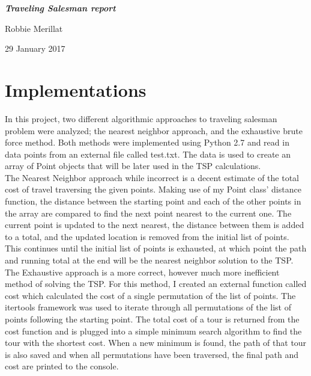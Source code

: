 \documentclass[11pt]{article}
\newcommand\tab[1][.5in]{\hspace*{#1}}
\begin{document}
\begin{titlepage}
\vspace*{\fill}
{
    \centering
    \bfseries
    \emph{\Huge Traveling Salesman report}
    \vskip 1.5in

    \Large Robbie Merillat \\
    \vskip 2in

    29 January 2017

}
\vspace*{\fill}
\clearpage
\end{titlepage}

\section{Implementations}
\tab In this project, two different algorithmic approaches to traveling salesman problem were analyzed; the nearest neighbor approach, and the exhaustive brute force method. Both methods were implemented using Python 2.7 and read in data points from an external file called test.txt. The data is used to create an array of Point objects that will be later used in the TSP calculations.\\
\tab The Nearest Neighbor approach while incorrect is a decent estimate of the total cost of travel traversing the given points. Making use of my Point class' distance function, the distance between the starting point and each of the other points in the array are compared to find the next point nearest to the current one. The current point is updated to the next nearest, the distance between them is added to a total, and the updated location is removed from the initial list of points. This continues until the initial list of points is exhausted, at which point the  path and running total at the end will be the nearest neighbor solution to the TSP.\\
\tab The Exhaustive approach is a more correct, however much more inefficient method of solving the TSP. For this method, I created an external function called cost which calculated the cost of a single permutation of the list of points. The itertools framework was used to iterate through all permutations of the list of points following the starting point. The total cost of a tour is returned from the cost function and is plugged into a simple minimum search algorithm to find the tour with the shortest cost. When a new minimum is found, the path of that tour is also saved and when all permutations have been traversed, the final path and cost are printed to the console.\par
\end{document}
